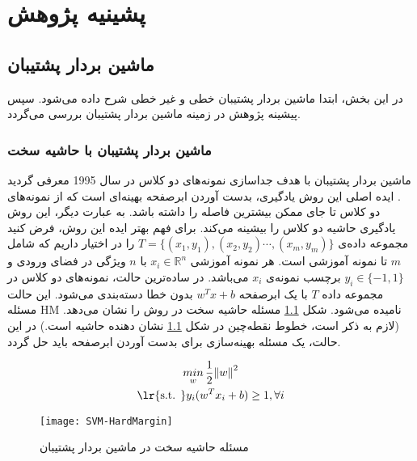 
\chapter{پشینیه پژوهش} \label{ch:2}
\section{ماشین بردار پشتیبان} \label{sec:2:1}
در این بخش، ابتدا ماشین بردار پشتیبان خطی و غیر خطی شرح داده می‌شود. سپس پیشینه پژوهش در زمینه ماشین بردار پشتیبان بررسی می‌گردد.
\subsection{ماشین بردار پشتیبان با حاشیه سخت} \label{sec:2:1:1}
ماشین بردار پشتیبان با هدف جداسازی نمونه‌های دو کلاس در سال 1995 معرفی گردید \cite{vapnik1995}. ایده اصلی این روش یادگیری، بدست آوردن ابرصفحه بهینه‌ای است که از نمونه‌های دو کلاس تا جای ممکن بیشترین فاصله را داشته باشد. به عبارت دیگر، این روش یادگیری حاشیه دو کلاس را بیشینه می‌کند. برای فهم بهتر ایده این روش، فرض کنید مجموعه داده‌ی $T=\{(x_1, y_1),(x_2, y_2) \cdots , (x_m, y_m)\}$ را در اختیار داریم که شامل $m$ تا نمونه آموزشی است. هر نمونه آموزشی $x_{i} \in \mathbb{R}^{n}$ با $n$ ویژگی در فضای ورودی و $y_i \in \{-1,1\}$ برچسب نمونه‌ی $x_i$ می‌باشد. در ساده‌ترین حالت، نمونه‌های دو کلاس در مجموعه داده $T$ با یک ابرصفحه $w^{T}x+b$ بدون خطا دسته‌بندی می‌شود. این حالت مسئله \gls{HM} نامیده می‌شود. شکل \ref{fig:SVM-HM} مسئله حاشیه سخت در روش  را نشان می‌دهد. (لازم به ذکر است، خطوط نقطه‌چین در شکل ‏\ref{fig:SVM-HM} نشان دهنده حاشیه است.) در این حالت، یک مسئله بهینه‌سازی برای بدست آوردن ابرصفحه باید حل گردد.

\begin{equation}
\begin{gathered} 
\mathop{min}\limits_{w}\frac{1}{2}{{\left\| w \right\|}^{2}} \\
\textrm{\lr{s.t. }} {{y}_{i}}({{w}^T}{{x}_{i}}+b)\ge 1,\forall i
\end{gathered}
\label{eq:1}
\end{equation}

\begin{figure}[!t]
	\centering
	\texttt{[image: SVM-HardMargin]}
	\caption{مسئله حاشیه سخت در ماشین بردار پشتیبان}
	\label{fig:SVM-HM}
\end{figure}

